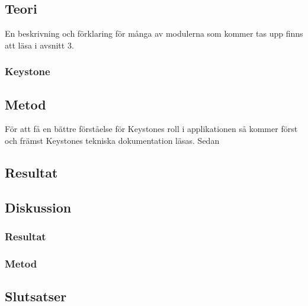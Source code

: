 \subsection{Teori}
En beskrivning och förklaring för många av modulerna som kommer tas upp finns att läsa i avsnitt 3.
\subsubsection{Keystone}


\subsection{Metod}
För att få en bättre förståelse för Keystones roll i applikationen så kommer först och främst Keystones tekniska dokumentation läsas. Sedan   
\subsection{Resultat}
\subsection{Diskussion}
\subsubsection{Resultat}
\subsubsection{Metod}
\subsection{Slutsatser}
